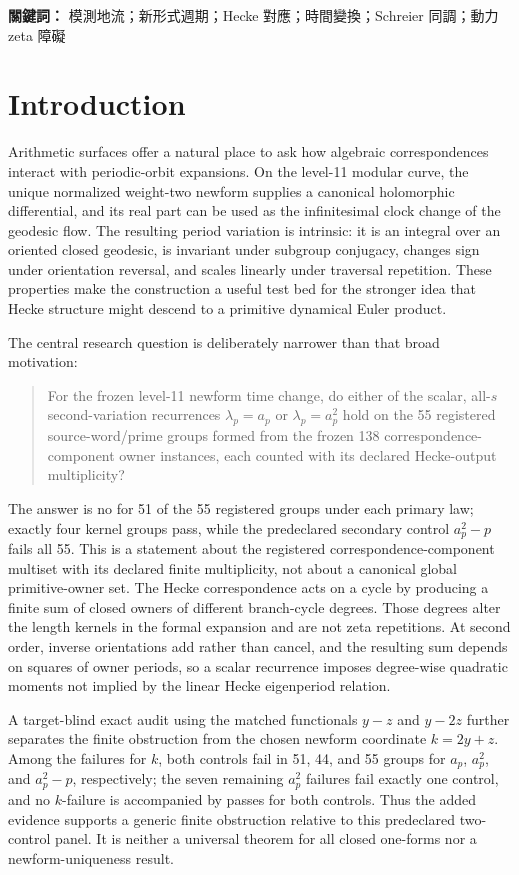 \documentclass[11pt]{article}
\theoremstyle{definition}
\theoremstyle{remark}
\begin{document}
\medskip
\noindent\textbf{關鍵詞：} 模測地流；新形式週期；Hecke 對應；時間變換；Schreier 同調；動力 zeta 障礙

\section{Introduction}

Arithmetic surfaces offer a natural place to ask how algebraic correspondences interact with periodic-orbit expansions. On the level-11 modular curve, the unique normalized weight-two newform supplies a canonical holomorphic differential, and its real part can be used as the infinitesimal clock change of the geodesic flow. The resulting period variation is intrinsic: it is an integral over an oriented closed geodesic, is invariant under subgroup conjugacy, changes sign under orientation reversal, and scales linearly under traversal repetition. These properties make the construction a useful test bed for the stronger idea that Hecke structure might descend to a primitive dynamical Euler product.

The central research question is deliberately narrower than that broad motivation:

\begin{quote}
For the frozen level-11 newform time change, do either of the scalar, all-$s$ second-variation recurrences $\lambda_p=a_p$ or $\lambda_p=a_p^2$ hold on the 55 registered source-word/prime groups formed from the frozen 138 correspondence-component owner instances, each counted with its declared Hecke-output multiplicity?
\end{quote}

The answer is no for 51 of the 55 registered groups under each primary law; exactly four kernel groups pass, while the predeclared secondary control $a_p^2-p$ fails all 55. This is a statement about the registered correspondence-component multiset with its declared finite multiplicity, not about a canonical global primitive-owner set. The Hecke correspondence acts on a cycle by producing a finite sum of closed owners of different branch-cycle degrees. Those degrees alter the length kernels in the formal expansion and are not zeta repetitions. At second order, inverse orientations add rather than cancel, and the resulting sum depends on squares of owner periods, so a scalar recurrence imposes degree-wise quadratic moments not implied by the linear Hecke eigenperiod relation.

A target-blind exact audit using the matched functionals $y-z$ and $y-2z$ further separates the finite obstruction from the chosen newform coordinate $k=2y+z$. Among the failures for $k$, both controls fail in 51, 44, and 55 groups for $a_p$, $a_p^2$, and $a_p^2-p$, respectively; the seven remaining $a_p^2$ failures fail exactly one control, and no $k$-failure is accompanied by passes for both controls. Thus the added evidence supports a generic finite obstruction relative to this predeclared two-control panel. It is neither a universal theorem for all closed one-forms nor a newform-uniqueness result.
\end{document}
